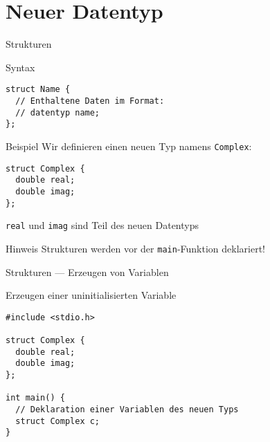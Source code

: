 \documentclass[presentation]{beamer}
\begin{document}
\section{Neuer Datentyp}
\label{sec:orga777947}
\begin{frame}[label={sec:org481fcad},fragile]{Strukturen}
 \begin{block}{Syntax}
\begin{verbatim}
struct Name {
  // Enthaltene Daten im Format:
  // datentyp name;
};
\end{verbatim}
\end{block}
\begin{exampleblock}{Beispiel}
Wir definieren einen  neuen Typ namens {\color{solarizedYellow}\verb!Complex!}:
\begin{verbatim}
struct Complex {
  double real;
  double imag;
};
\end{verbatim}
{\color{solarizedYellow}\verb!real!} und {\color{solarizedYellow}\verb!imag!} sind Teil des neuen Datentyps
\end{exampleblock}
\begin{alertblock}{Hinweis}
Strukturen werden vor der {\color{solarizedYellow}\verb!main!}-Funktion deklariert!
\end{alertblock}
\end{frame}
\begin{frame}[label={sec:org1901790},fragile]{Strukturen --- Erzeugen von Variablen}
 \begin{exampleblock}{Erzeugen einer uninitialisierten Variable}
\begin{verbatim}
#include <stdio.h>

struct Complex {
  double real;
  double imag;
};

int main() {
  // Deklaration einer Variablen des neuen Typs
  struct Complex c;
}
\end{verbatim}
\end{exampleblock}
\end{frame}
\end{document}
